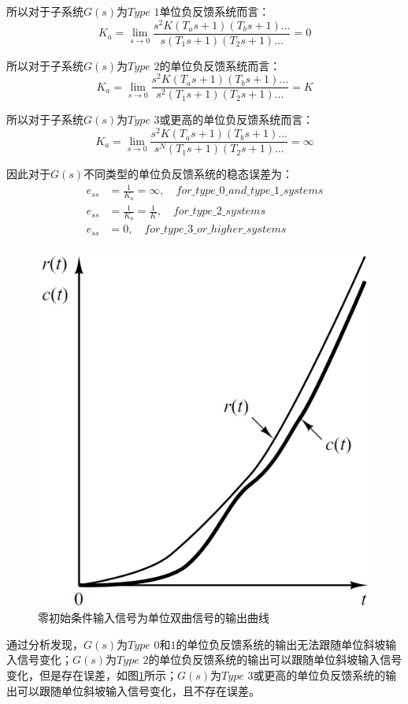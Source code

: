 \documentclass{article}
\numberwithin{equation}{section}
\numberwithin{figure}{section}
\begin{document}
所以对于子系统$G(s)$为$Type$ $1$单位负反馈系统而言：
\begin{equation}
    K_a=\lim_{s\rightarrow 0}\frac{s^2K(T_as+1)(T_bs+1)...}{s(T_1s+1)(T_2s+1)...}=0
\end{equation}

所以对于子系统$G(s)$为$Type$ $2$的单位负反馈系统而言：
\begin{equation}
    K_a=\lim_{s\rightarrow 0}\frac{s^2K(T_as+1)(T_bs+1)...}{s^2(T_1s+1)(T_2s+1)...}=K
\end{equation}

所以对于子系统$G(s)$为$Type$ $3$或更高的单位负反馈系统而言：
\begin{equation}
    K_a=\lim_{s\rightarrow 0}\frac{s^2K(T_as+1)(T_bs+1)...}{s^N(T_1s+1)(T_2s+1)...}=\infty
\end{equation}

因此对于$G(s)$不同类型的单位负反馈系统的稳态误差为：
\begin{equation}
    \begin{split}
        e_{ss}&=\frac{1}{K_a}=\infty,\quad for\_type\_0\_and\_type\_1\_systems\\
        e_{ss}&=\frac{1}{K_a}=\frac{1}{K},\quad for\_type\_2\_systems\\
        e_{ss}&=0,\quad for\_type\_3\_or\_higher\_systems
    \end{split}
\end{equation}

\begin{figure}
    \centering
    \includegraphics[width=.4\textwidth]{Chapter5/unitparabolictype2.png} %
    \caption{零初始条件输入信号为单位双曲信号的输出曲线} %
    \label{unitparabolictype2} %
\end{figure}

通过分析发现，$G(s)$为$Type$ $0$和$1$的单位负反馈系统的输出无法跟随单位斜坡输入信号变化；$G(s)$为$Type$ $2$的单位负反馈系统的输出可以跟随单位斜坡输入信号变化，但是存在误差，如图\ref{unitparabolictype2}所示；$G(s)$为$Type$ $3$或更高的单位负反馈系统的输出可以跟随单位斜坡输入信号变化，且不存在误差。
\end{document}
